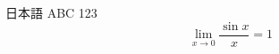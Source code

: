 \documentclass{article}
\begin{document}
日本語 ABC 123
\[\lim_{x\to0}\frac{\sin x}{x}=1\]
\end{document}
